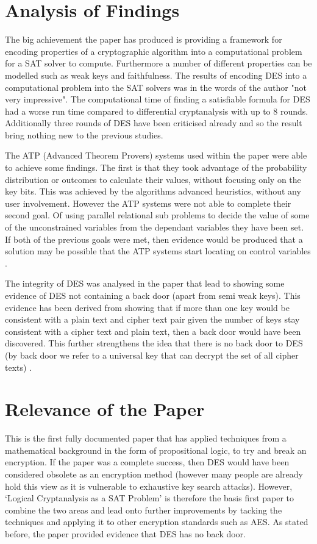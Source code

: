 \documentclass[11pt,a4paper, notitlepage]{report}
\begin{document}
\section{Analysis of Findings}
\label{sec:AnalysisOF}

The big achievement the paper has produced is providing a framework for encoding properties of a cryptographic algorithm into a computational problem for a SAT solver to compute. Furthermore a number of different properties can be modelled such as weak keys and faithfulness. The results of encoding DES into a computational problem into the SAT solvers was in the words of the author "not very impressive". The computational time of finding a satisfiable formula for DES had a worse run time compared to differential cryptanalysis with up to 8 rounds. Additionally three rounds of DES have been criticised already and so the result bring nothing new to the previous studies. 

The ATP (Advanced Theorem Provers) systems used within the paper were able to achieve some findings. The first is that they took advantage of the probability distribution or outcomes to calculate their values, without focusing only on the key bits. This was achieved by the algorithms advanced heuristics, without any user involvement. However the ATP systems were not able to complete their second goal. Of using parallel relational sub problems to decide the value of some of the unconstrained variables from the dependant variables they have been set. If both of the previous goals were met, then evidence would be produced that a solution may be possible that the ATP systems start locating on control variables \cite{Fabio2000LogicalSAT}. 
  
The integrity of DES was analysed in the paper that lead to showing some evidence of DES not containing a back door (apart from semi weak keys). This evidence has been derived from showing that if more than one key would be consistent with a plain text and cipher text pair given the number of keys stay consistent with a cipher text and plain text, then a back door would have been discovered. This further strengthens the idea that there is no back door to DES (by back door we refer to a universal key that can decrypt the set of all cipher texts) \cite{Fabio2000LogicalSAT}. 
 
\section{Relevance of the Paper}
\label{sec:RelOfPaper}
This is the first fully documented paper that has applied techniques from a mathematical background in the form of propositional logic, to try and break an encryption. If the paper was a complete success, then DES would have been considered obsolete as an encryption method (however many people are already hold this view as it is vulnerable to exhaustive key search attacks). However, `Logical Cryptanalysis as a SAT Problem' \cite{Fabio2000LogicalSAT} is therefore the basis first paper to combine the two areas and lead onto further improvements by tacking the techniques and applying it to other encryption standards such as AES. As stated before, the paper provided evidence that DES has no back door. 
 
\end{document}
